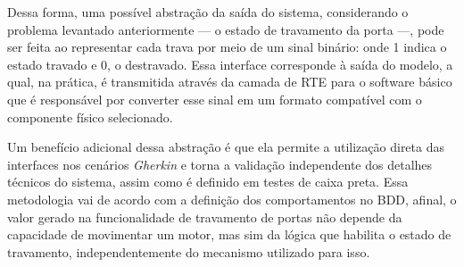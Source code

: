 Dessa forma, uma possível abstração da saída do sistema, considerando o problema levantado anteriormente — o estado de travamento da porta —, pode ser feita ao 
representar cada trava por meio de um sinal binário: onde 1 indica o estado travado e 0, o destravado. Essa interface corresponde à saída do modelo, a qual, na 
prática, é transmitida através da camada de RTE para o software básico que é responsável por converter esse sinal em um formato compatível com o componente físico 
selecionado.

Um benefício adicional dessa abstração é que ela permite a utilização direta das interfaces nos cenários \textit{Gherkin} e torna a validação independente dos detalhes 
técnicos do sistema, assim como é definido em testes de caixa preta. Essa metodologia vai de acordo com a definição dos comportamentos no BDD, afinal, o valor 
gerado na funcionalidade de travamento de portas não depende da capacidade de movimentar um motor, mas sim da lógica que habilita o estado de travamento, 
independentemente do mecanismo utilizado para isso.